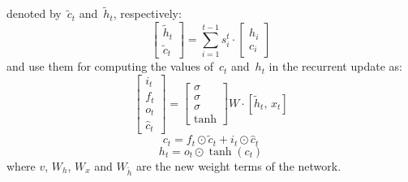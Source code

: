 \documentclass[11pt,letterpaper]{article}
\begin{document}
                        denoted by~$\tilde{c}_t$ and~$\tilde{h}_t$, respectively:
                        \begin{equation}
                        \begin{bmatrix}
                        \tilde{h}_t\\ \tilde{c}_t
                        \end{bmatrix} = \sum\limits_{i=1}^{t-1} s_i^t \cdot
                        \begin{bmatrix}
                        h_i\\ c_i
                        \end{bmatrix} 
                        \end{equation}
                        and use them for computing the
                        values of~$c_t$ and~$h_t$ in the recurrent update as:
	\begin{equation}
		\begin{bmatrix}
			i_t\\ f_t\\ o_t\\ \hat{c}_t
		\end{bmatrix} =
		\begin{bmatrix} \sigma\\ \sigma\\ \sigma\\ \tanh
		\end{bmatrix} W \cdot [\tilde{h}_t, \, x_t]
		\label{gates}
	\end{equation}
	\begin{equation} c_t = f_t \odot \tilde{c}_t +
		i_t \odot \hat{c}_t
	\end{equation}
	\begin{equation} h_t = o_t \odot \tanh(c_t)
	\label{endintra}
	\end{equation} 
	where $v$, $W_h$, $W_x$ and $W_{\tilde{h}}$ are the new weight terms of the network. 
	
\end{document}
